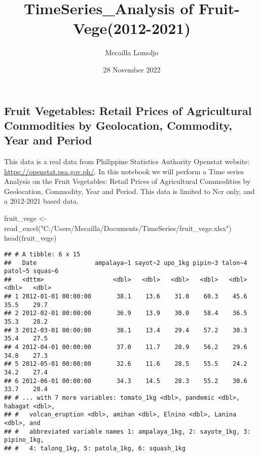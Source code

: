 \documentclass[
]{article}
\title{TimeSeries\_Analysis of Fruit-Vege(2012-2021)}
\author{Mecailla Lomoljo}
\date{28 November 2022}
\newenvironment{Shaded}{\begin{snugshade}}{\end{snugshade}}
\newcommand{\FunctionTok}[1]{\textcolor[rgb]{0.00,0.00,0.00}{#1}}
\newcommand{\NormalTok}[1]{#1}
\newcommand{\OtherTok}[1]{\textcolor[rgb]{0.56,0.35,0.01}{#1}}
\newcommand{\StringTok}[1]{\textcolor[rgb]{0.31,0.60,0.02}{#1}}
\begin{document}
\maketitle

\hypertarget{fruit-vegetables-retail-prices-of-agricultural-commodities-by-geolocation-commodity-year-and-period}{%
\subsection{Fruit Vegetables: Retail Prices of Agricultural Commodities
by Geolocation, Commodity, Year and
Period}\label{fruit-vegetables-retail-prices-of-agricultural-commodities-by-geolocation-commodity-year-and-period}}

This data is a real data from Philippine Statistics Authority Openstat
website: \url{https://openstat.psa.gov.ph/}. In this notebook we will
perform a Time series Analysis on the Fruit Vegetables: Retail Prices of
Agricultural Commodities by Geolocation, Commodity, Year and Period.
This data is limited to Ncr only, and a 2012-2021 based data.

\begin{Shaded}
\begin{Highlighting}[]
\NormalTok{fruit\_vege }\OtherTok{\textless{}{-}} \FunctionTok{read\_excel}\NormalTok{(}\StringTok{"C:/Users/Mecailla/Documents/TimeSeries/fruit\_vege.xlsx"}\NormalTok{)}
\FunctionTok{head}\NormalTok{(fruit\_vege)}
\end{Highlighting}
\end{Shaded}

\begin{verbatim}
## # A tibble: 6 x 15
##   Date                ampalaya~1 sayot~2 upo_1kg pipin~3 talon~4 patol~5 squas~6
##   <dttm>                   <dbl>   <dbl>   <dbl>   <dbl>   <dbl>   <dbl>   <dbl>
## 1 2012-01-01 00:00:00       38.1    13.6    31.0    60.3    45.6    35.5    29.7
## 2 2012-02-01 00:00:00       36.9    13.9    30.0    58.4    36.5    35.3    28.2
## 3 2012-03-01 00:00:00       38.1    13.4    29.4    57.2    30.3    35.4    27.5
## 4 2012-04-01 00:00:00       37.0    11.7    28.9    56.2    29.6    34.8    27.3
## 5 2012-05-01 00:00:00       32.6    11.6    28.5    55.5    24.2    34.2    27.4
## 6 2012-06-01 00:00:00       34.3    14.5    28.3    55.2    30.6    33.7    28.4
## # ... with 7 more variables: tomato_1kg <dbl>, pandemic <dbl>, habagat <dbl>,
## #   volcan_eruption <dbl>, amihan <dbl>, Elnino <dbl>, Lanina <dbl>, and
## #   abbreviated variable names 1: ampalaya_1kg, 2: sayote_1kg, 3: pipino_1kg,
## #   4: talong_1kg, 5: patola_1kg, 6: squash_1kg
\end{verbatim}
\end{document}
